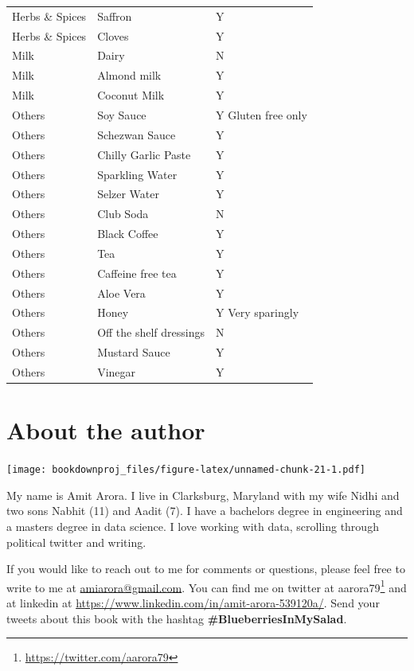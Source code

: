 \documentclass[
  oneside]{book}
\DeclareRobustCommand{\href}[2]{#2\footnote{\url{#1}}}
\begin{document}
\begin{longtable}[t]{lll}
Herbs \& Spices & Saffron & Y\\
\addlinespace
Herbs \& Spices & Cloves & Y\\
Milk & Dairy & N\\
Milk & Almond milk & Y\\
Milk & Coconut Milk & Y\\
Others & Soy Sauce & Y
Gluten free only\\
\addlinespace
Others & Schezwan Sauce & Y\\
Others & Chilly Garlic Paste & Y\\
Others & Sparkling Water & Y\\
Others & Selzer Water & Y\\
Others & Club Soda & N\\
\addlinespace
Others & Black Coffee & Y\\
Others & Tea & Y\\
Others & Caffeine free tea & Y\\
Others & Aloe Vera & Y\\
Others & Honey & Y
Very sparingly\\
\addlinespace
Others & Off the shelf dressings & N\\
Others & Mustard Sauce & Y\\
Others & Vinegar & Y\\*
\end{longtable}

\hypertarget{about-the-author}{%
\chapter{About the author}\label{about-the-author}}

\texttt{[image: bookdownproj\_files/figure-latex/unnamed-chunk-21-1.pdf]}

My name is Amit Arora. I live in Clarksburg, Maryland with my wife Nidhi and two sons Nabhit (11) and Aadit (7). I have a bachelors degree in engineering and a masters degree in data science. I love working with data, scrolling through political twitter and writing.

If you would like to reach out to me for comments or questions, please feel free to write to me at \url{amiarora@gmail.com}. You can find me on twitter at \href{https://twitter.com/aarora79}{aarora79} and at linkedin at \url{https://www.linkedin.com/in/amit-arora-539120a/}. Send your tweets about this book with the hashtag \textbf{\#BlueberriesInMySalad}.
\end{document}
